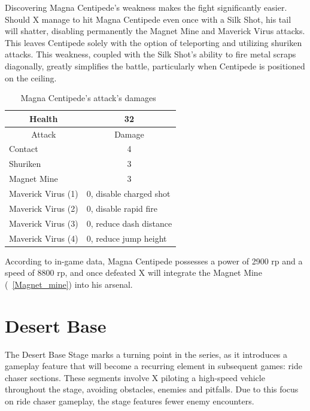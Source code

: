 Discovering Magna Centipede's weakness makes the fight significantly easier. Should X manage to hit Magna Centipede even once with a Silk Shot, his tail will shatter, disabling permanently the Magnet Mine and Maverick Virus attacks. This leaves Centipede solely with the option of teleporting and utilizing shuriken attacks. This weakness, coupled with the Silk Shot's ability to fire metal scraps diagonally, greatly simplifies the battle, particularly when Centipede is positioned on the ceiling.

\begin{table}[htp]
	\centering
	\begin{tabular}[h]{l c}
		\toprule
		\multicolumn{1}{c}{Health}  & 32 \\
		\midrule
		\multicolumn{1}{c}{Attack} & \multicolumn{1}{c}{Damage}\\
		Contact & 4 \\
		Shuriken & 3\\
		Magnet Mine& 3\\
		Maverick Virus (1) & \multicolumn{1}{l}{0, disable charged shot}\\
		Maverick Virus (2) & \multicolumn{1}{l}{0, disable rapid fire}\\
		Maverick Virus (3) & \multicolumn{1}{l}{0, reduce dash distance}\\
		Maverick Virus (4) & \multicolumn{1}{l}{0, reduce jump height}\\
		\bottomrule
	\end{tabular}
	\caption{Magna Centipede's attack's damages~\cite{wiki:Magna_centipede,book:Compendium}}
\end{table}
According to in-game data, Magna Centipede possesses a power of 2900 rp and a speed of 8800 rp, and once defeated X will integrate the Magnet Mine (~\ref{Magnet_mine}) into his arsenal.



\section{Desert Base}
The Desert Base Stage marks a turning point in the series, as it introduces a gameplay feature that will become a recurring element in subsequent games: ride chaser sections. These segments involve X piloting a high-speed vehicle throughout the stage, avoiding obstacles, enemies  and pitfalls. Due to this focus on ride chaser gameplay, the stage features fewer enemy encounters.

